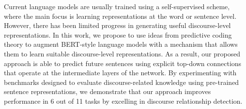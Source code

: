 Current language models are usually trained using a self-supervised scheme, where the main focus is learning representations at the word or sentence level. However, there has been limited progress in generating useful discourse-level representations. In this work, we propose to use ideas from predictive coding theory to augment BERT-style language models with a mechanism that allows them to learn suitable discourse-level representations. As a result, our proposed approach is able to predict future sentences using explicit top-down connections that operate at the intermediate layers of the network. By experimenting with benchmarks designed to evaluate discourse-related knowledge using pre-trained sentence representations, we demonstrate that our approach improves performance in 6 out of 11 tasks by excelling in discourse relationship detection.
